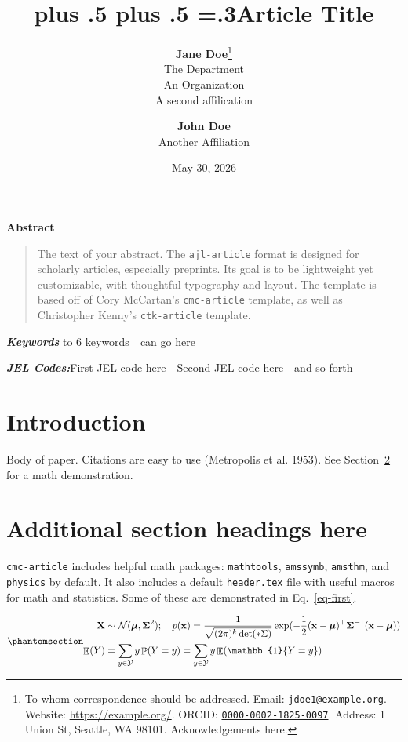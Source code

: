 \documentclass[
  11pt,
]{article}
\title{\sffamily\bfseries\huge\parfillskip=0pt
\rightskip=0pt plus .5\textwidth
\leftskip=0pt plus .5\textwidth
\emergencystretch=.3\textwidth Article Title}
\author{\textbf{Jane Doe}\footnote{
To whom correspondence should be addressed.
Email: \texttt{\href{mailto:jdoe1@example.org}{jdoe1@example.org}}.
Website: \url{https://example.org/}.
ORCID: \texttt{\href{https://orcid.org/0000-0002-1825-0097}{0000-0002-1825-0097}}.
Address:
1 Union St, Seattle, WA 98101.
Acknowledgements here.}
\\The Department%
\\An Organization%
\vspace{2pt}
%
\\A second affilication%
\vspace{2pt}
 \and \textbf{John Doe}
%
\\Another Affiliation%
\vspace{2pt}
 }
\date{May 30, 2026}
\theoremstyle{plain}
\theoremstyle{remark}
\renewenvironment{abstract}{
  \centerline
  {\large\sffamily\bfseries Abstract}\vspace{-0.25em}
  \begin{quote}\small
}{
  \end{quote}
}
\begin{document}
\allsectionsfont{\sffamily}

\maketitle

\begin{abstract}
The text of your abstract. The \texttt{ajl-article} format is designed
for scholarly articles, especially preprints. Its goal is to be
lightweight yet customizable, with thoughtful typography and layout. The
template is based off of Cory McCartan's \texttt{cmc-article} template,
as well as Christopher Kenny's \texttt{ctk-article} template.
\end{abstract}

\textbf{\textit{Keywords}} to 6 keywords~\textbullet~can go here

\textbf{\textit{JEL Codes:}}\quad First JEL code here~\textbullet~Second
JEL code here~\textbullet~and so forth


\clearpage

\section{Introduction}\label{sec-intro}

Body of paper. Citations are easy to use (Metropolis et al. 1953). See
Section~\ref{sec-addl} for a math demonstration.

\section{Additional section headings here}\label{sec-addl}

\texttt{cmc-article} includes helpful math packages: \texttt{mathtools},
\texttt{amssymb}, \texttt{amsthm}, and \texttt{physics} by default. It
also includes a default \texttt{header.tex} file with useful macros for
math and statistics. Some of these are demonstrated in
Eq.~\ref{eq-first}.

\begin{equation}\protect\phantomsection\label{eq-first}{
\begin{aligned}
   \mathbf{X} &\sim \mathcal{N}(\boldsymbol{\mu}, \boldsymbol{\Sigma}^2); \quad
    p(\mathbf{x}) = \frac{1}{\sqrt{(2\pi)^k\det(\mathbf{*}\Sigma)}}
        \exp(-\frac{1}{2} (\mathbf{x}-\boldsymbol{\mu})^\top \boldsymbol{\Sigma}^{-1} (\mathbf{x}-\boldsymbol{\mu})) \\
    \mathop{\mathrm{\mathbb{E}}}(Y) &= \sum_{y\in\mathcal{Y}} y\mathop{\mathrm{\mathbb{P}}}(Y=y)
    = \sum_{y\in\mathcal{Y}} y\mathop{\mathrm{\mathbb{E}}}(\mathbb{1}\{Y=y\})
\end{aligned}
}\end{equation}
\end{document}
